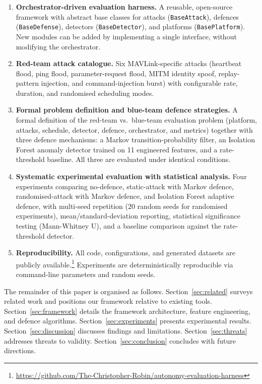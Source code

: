 \begin{enumerate}
    \item \textbf{Orchestrator-driven evaluation harness.}
    A reusable, open-source framework with abstract base classes for attacks (\texttt{BaseAttack}), defences (\texttt{BaseDefense}), detectors (\texttt{BaseDetector}), and platforms (\texttt{BasePlatform}).
    New modules can be added by implementing a single interface, without modifying the orchestrator.

    \item \textbf{Red-team attack catalogue.}
    Six MAVLink-specific attacks (heartbeat flood, ping flood, parameter-request flood, MITM identity spoof, replay-pattern injection, and command-injection burst) with configurable rate, duration, and randomised scheduling modes.

    \item \textbf{Formal problem definition and blue-team defence strategies.}
    A formal definition of the red-team vs.\ blue-team evaluation problem (platform, attacks, schedule, detector, defence, orchestrator, and metrics) together with three defence mechanisms: a Markov transition-probability filter, an Isolation Forest anomaly detector trained on 11 engineered features, and a rate-threshold baseline. All three are evaluated under identical conditions.


    \item \textbf{Systematic experimental evaluation with statistical analysis.}
    Four experiments comparing no-defence, static-attack with Markov defence, randomised-attack with Markov defence, and Isolation Forest adaptive defence, with multi-seed repetition (20 random seeds for randomised experiments), mean/standard-deviation reporting, statistical significance testing (Mann-Whitney U), and a baseline comparison against the rate-threshold detector.

    \item \textbf{Reproducibility.}
    All code, configurations, and generated datasets are publicly available.\footnote{\url{https://github.com/The-Christopher-Robin/autonomy-evaluation-harness}} Experiments are deterministically reproducible via command-line parameters and random seeds.
\end{enumerate}

The remainder of this paper is organised as follows.
Section~\ref{sec:related} surveys related work and positions our framework relative to existing tools.
Section~\ref{sec:framework} details the framework architecture, feature engineering, and defence algorithms.
Section~\ref{sec:experiments} presents experimental results.
Section~\ref{sec:discussion} discusses findings and limitations.
Section~\ref{sec:threats} addresses threats to validity.
Section~\ref{sec:conclusion} concludes with future directions.
